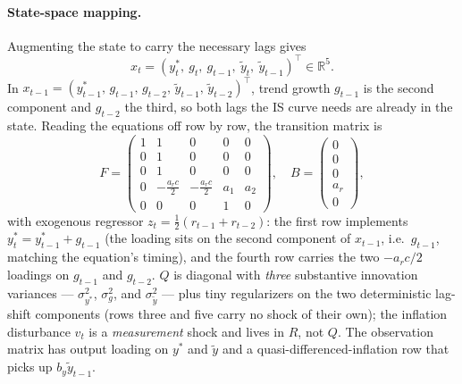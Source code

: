 \documentclass[11pt]{article}
\begin{document}
\paragraph{State-space mapping.}  Augmenting the state to carry the
necessary lags gives
\begin{equation}
x_t=(y^*_t,\ g_t,\ g_{t-1},\ \widetilde y_t,\ \widetilde y_{t-1})^\top\in\mathbb R^5.
\end{equation}
In $x_{t-1}=(y^*_{t-1},\,g_{t-1},\,g_{t-2},\,\widetilde y_{t-1},\,
\widetilde y_{t-2})^\top$, trend growth $g_{t-1}$ is the second
component and $g_{t-2}$ the third, so both lags the IS curve needs are
already in the state.  Reading the equations off row by row, the
transition matrix is
\begin{equation}
F=\begin{pmatrix}
1 & 1 & 0 & 0 & 0\\
0 & 1 & 0 & 0 & 0\\
0 & 1 & 0 & 0 & 0\\
0 & -\tfrac{a_r c}{2} & -\tfrac{a_r c}{2} & a_1 & a_2\\
0 & 0 & 0 & 1 & 0
\end{pmatrix},
\quad B=\begin{pmatrix}0\\0\\0\\a_r\\0\end{pmatrix},
\end{equation}
with exogenous regressor $z_t=\tfrac12(r_{t-1}+r_{t-2})$: the first
row implements $y^*_t=y^*_{t-1}+g_{t-1}$ (the loading sits on the
second component of $x_{t-1}$, i.e.\ $g_{t-1}$, matching the equation's
timing), and the fourth row carries the two $-a_r c/2$ loadings on
$g_{t-1}$ and $g_{t-2}$.  $Q$ is diagonal with \emph{three}
substantive innovation variances ---
$\sigma_{y^*}^2$, $\sigma_g^2$, and $\sigma_{\widetilde y}^2$ ---
plus tiny regularizers on the two deterministic lag-shift components
(rows three and five carry no shock of their own); the inflation
disturbance $v_t$ is a \emph{measurement} shock and lives in $R$, not
$Q$.  The observation matrix has output loading on $y^*$ and
$\widetilde y$ and a quasi-differenced-inflation row that picks up
$b_y\widetilde y_{t-1}$.
\end{document}
